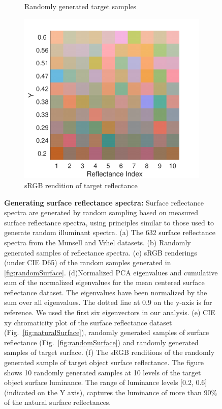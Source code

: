 \documentclass{jov}
\begin{document}
\begin{figure}
\begin{subfigure}[b]{0.3\textwidth}
        \caption{Randomly generated target samples}
        \label{fig:randomSurfaceTarget}
    \end{subfigure}
    \begin{subfigure}[b]{0.3 \textwidth}
    \centering
        \includegraphics[width=\textwidth]{../Figures/Figure7/Figure7_f.pdf}
        \caption{sRGB rendition of target reflectance}
        \label{fig:sRGBSurfaceTarget}
    \end{subfigure}
    \caption{{\bf Generating surface reflectance spectra:} Surface reflectance spectra are generated by random sampling based on measured surface reflectance spectra, using principles similar to those used to generate random illuminant spectra. (a) The 632 surface reflectance spectra from the Munsell and Vrhel datasets. (b) Randomly generated samples of reflectance spectra. (c) sRGB renderings (under CIE D65) of the random samples generated in \ref{fig:randomSurface}. (d)Normalized PCA eigenvalues and cumulative sum of the normalized eigenvalues for the mean centered surface reflectance dataset. The eigenvalues have been normalized by the sum over all eigenvalues. The dotted line at 0.9 on the y-axis is for reference. We used the first six eigenvectors in our analysis. (e) CIE xy chromaticity plot of the surface reflectance dataset (Fig.~\ref{fig:naturalSurface}), randomly generated samples of surface reflectance (Fig.~\ref{fig:randomSurface}) and randomly generated samples of target surface. (f) The sRGB renditions of the randomly generated sample of target object surface reflectance. The figure shows 10 randomly generated samples at 10 levels of the target object surface luminance. The range of luminance levels [0.2, 0.6] (indicated on the Y axis), captures the luminance of more than 90\% of the natural surface reflectances.}
\label{fig:surfaceReflectanceGeneration}
\end{figure}
\end{document}
